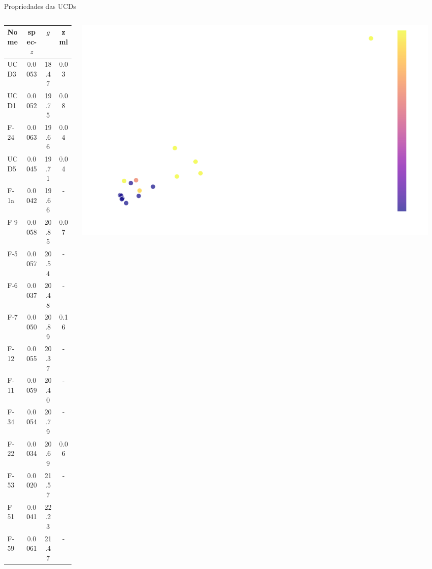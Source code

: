 \begin{frame}[c]{Propriedades das UCDs}
    \begin{columns}[c]
        \begin{column}{0.48\textwidth}
            \begin{table}[!ht]
                \centering
                \scriptsize
                \begin{tabular}{lccc}
                    \toprule
                    Nome & spec-$z$ & $g$ & zml \\
                    \midrule
                    UCD3 & 0.0053 & 18.47 & 0.03 \\
                    UCD1 & 0.0052 & 19.75 & 0.08 \\
                    F-24 & 0.0063 & 19.66 & 0.04 \\
                    UCD5 & 0.0045 & 19.71 & 0.04 \\
                    F-1a & 0.0042 & 19.66 & -    \\
                    F-9  & 0.0058 & 20.85 & 0.07 \\
                    F-5  & 0.0057 & 20.54 & -    \\
                    F-6  & 0.0037 & 20.48 & -    \\
                    F-7  & 0.0050 & 20.89 & 0.16 \\
                    F-12 & 0.0055 & 20.37 & -    \\
                    F-11 & 0.0059 & 20.40 & -    \\
                    F-34 & 0.0054 & 20.79 & -    \\
                    F-22 & 0.0034 & 20.69 & 0.06 \\
                    F-53 & 0.0020 & 21.57 & -    \\
                    F-51 & 0.0041 & 22.23 & -    \\
                    F-59 & 0.0061 & 21.47 & -    \\
                    \bottomrule
                \end{tabular}
                \label{tab:ucds_know_z_gmag}
            \end{table}
        \end{column}
        \begin{column}{0.48\textwidth}
            \centering
            \includegraphics[width=\textwidth, height=0.48\textheight]{images/r_h_M_ucds.png}

\end{column}
\end{columns}
\end{frame}
